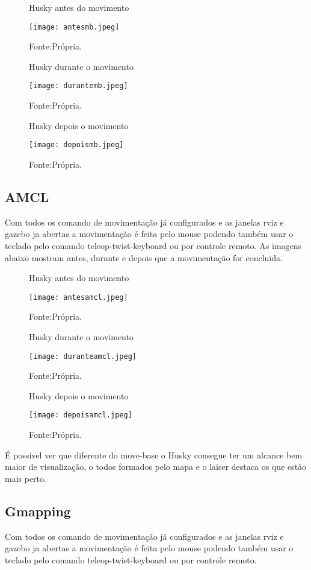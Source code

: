\begin{figure} [h!]	
    \centering
    \caption{Husky antes do movimento}
    \texttt{[image: antesmb.jpeg]}
    \caption*{Fonte:Própria.}
    \label{fig:antesmovebase}
\end{figure}
\begin{figure} [h!]	
    \centering
    \caption{Husky durante o movimento}
    \texttt{[image: durantemb.jpeg]}
    \caption*{Fonte:Própria.}
    \label{fig:durantemovebase}
\end{figure}
\begin{figure} [h!]	
    \centering
    \caption{Husky depois o movimento}
    \texttt{[image: depoismb.jpeg]}
    \caption*{Fonte:Própria.}
    \label{fig:depoismovebase}
\end{figure}
\subsection{AMCL}
Com todos os comando de movimentação já configurados e as janelas rviz e gazebo ja abertas a movimentação é feita pelo mouse podendo também usar o teclado pelo comando teleop-twist-keyboard ou por controle remoto.
As imagens abaixo mostram antes, durante e depois que a movimentação for concluida.
\begin{figure} [h!]	
    \centering
    \caption{Husky antes do movimento}
    \texttt{[image: antesamcl.jpeg]}
    \caption*{Fonte:Própria.}
    \label{fig:antesamcl}
\end{figure}
\begin{figure} [h!]	
    \centering
    \caption{Husky durante o movimento}
    \texttt{[image: duranteamcl.jpeg]}
    \caption*{Fonte:Própria.}
    \label{fig:duranteamcl}
\end{figure}
\begin{figure} [h!]	
    \centering
    \caption{Husky depois o movimento}
    \texttt{[image: depoisamcl.jpeg]}
    \caption*{Fonte:Própria.}
    \label{fig:depoisamcl}
\end{figure}
É possivel ver que diferente do move-base o Husky consegue ter um alcance bem maior de visualização, o todos formados pelo mapa e o laiser destaca os que estão mais perto.
\subsection{Gmapping}
Com todos os comando de movimentação já configurados e as janelas rviz e gazebo ja abertas a movimentação é feita pelo mouse podendo também usar o teclado pelo comando teleop-twist-keyboard ou por controle remoto.

